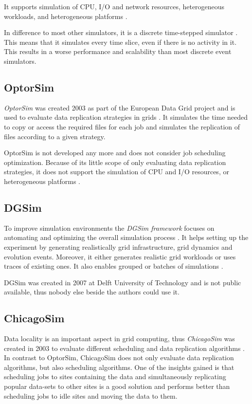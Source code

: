 It supports simulation of CPU, I/O and network resources, heterogeneous workloads, and heterogeneous platforms \cite{dumitrescu2005gangsim}.

In difference to most other simulators, it is a discrete time-stepped simulator \cite{dgsim}. This means that it simulates every time slice, even if there is no activity in it. This results in a worse performance and scalability than most discrete event simulators.


\newpage
\subsection{OptorSim}
\textit{OptorSim} was created 2003 as part of the European Data Grid project and is used to evaluate data replication strategies in grids \cite{optorsim}. It simulates the time needed to copy or access the required files for each job and simulates the replication of files according to a given strategy.

OptorSim is not developed any more and does not consider job scheduling optimization. Because of its little scope of only evaluating data replication strategies, it does not support the simulation of CPU and I/O resources, or heterogeneous platforms \cite{optorsim}.


\subsection{DGSim}
To improve simulation environments the \textit{DGSim framework} focuses on automating and optimizing the overall simulation process \cite{dgsim}. It helps setting up the experiment by generating realistically grid infrastructure, grid dynamics and evolution events. Moreover, it either generates realistic grid workloads or uses traces of existing ones. It also enables grouped or batches of simulations \cite{dgsim}.

DGSim was created in 2007 at Delft University of Technology and is not public available, thus nobody else beside the authors could use it.


\subsection{ChicagoSim}
Data locality is an important aspect in grid computing, thus \textit{ChicagoSim} was created in 2003 to evaluate different scheduling and data replication algorithms \cite{chicagosim}. In contrast to OptorSim, ChicagoSim does not only evaluate data replication algorithms, but also scheduling algorithms. 
One of the insights gained is that scheduling jobs to sites containing the data and simultaneously replicating popular data-sets to other sites is a good solution and performs better than scheduling jobs to idle sites and moving the data to them.

